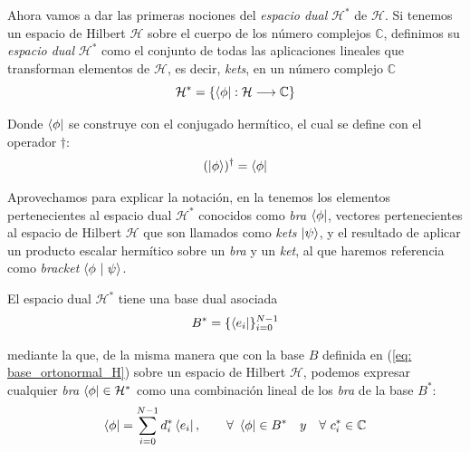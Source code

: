 \documentclass{article}
\numberwithin{equation}{section} %
\begin{document}
    \vspace{5mm}

    Ahora vamos a dar las primeras nociones del \textit{espacio dual} \( \mathcal{H} ^ {*} \) de \( \mathcal{H} \). Si tenemos un espacio de Hilbert \( \mathcal{H} \) sobre el cuerpo de los número complejos \( \mathbb{C} \), definimos su \textit{espacio dual} \( \mathcal{H} ^ {*} \) como el conjunto de todas las aplicaciones lineales que transforman elementos de \( \mathcal{H} \), es decir, \textit{kets}, en un número complejo \( \mathbb{C} \)
    \begin{equation*}
        \mathcal{H} ^ {*} = \{ \bra{\phi}: \mathcal{H} \longrightarrow \mathbb{C} \}
    \end{equation*}

    \vspace{1.5mm}

    Donde \( \bra{\phi} \) se construye con el conjugado hermítico, el cual se define con el operador \( \dagger \):
    \begin{equation}
        ( \ket{\phi} )^{\dagger} = \bra{\phi}
        \label{eq: conjugado_hermitico}
    \end{equation}

    \vspace{1.5mm}

    Aprovechamos para explicar la notación, en la tenemos los elementos pertenecientes al espacio dual \( \mathcal{H} ^ {*} \) conocidos como \textit{bra} \( \bra{\phi} \), vectores pertenecientes al espacio de Hilbert \( \mathcal{H} \) que son llamados como \textit{kets} \( \ket{\psi} \), y el resultado de aplicar un producto escalar hermítico sobre un \textit{bra} y un \textit{ket}, al que haremos referencia como \textit{bracket} \( \braket{\phi \ | \ \psi} \).

    \vspace{5mm}

    El espacio dual \( \mathcal{H} ^ {*} \) tiene una base dual asociada
    \begin{equation}
        B ^ {*} = \{ \bra{e_{i}} \} _{i = 0}^{N - 1}
    \end{equation}

    \vspace{1.5mm}

    mediante la que, de la misma manera que con la base \( B \) definida en (\ref{eq: base_ortonormal_H}) sobre un espacio de Hilbert \( \mathcal{H} \), podemos expresar cualquier \textit{bra} \( \bra{\phi} \in \mathcal{H} ^ {*} \) como una combinación lineal de los \textit{bra} de la base \( B ^ {*} \):
    \begin{equation}
        \bra{\phi} = \sum_{i = 0}^{N - 1} d_{i}^{*} \bra{e_{i}}, \qquad \forall \ \bra{\phi} \in B^{*} \quad y \quad \forall \ c_{i}^{*} \in \mathbb{C}
        \label{eq: combinacion_lineal_hilbert_dual}
    \end{equation}    
\end{document}
